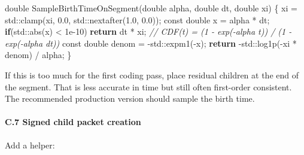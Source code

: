 \documentclass[
]{article}
\newenvironment{Shaded}{}{}
\newcommand{\AttributeTok}[1]{\textcolor[rgb]{0.49,0.56,0.16}{#1}}
\newcommand{\BuiltInTok}[1]{\textcolor[rgb]{0.00,0.50,0.00}{#1}}
\newcommand{\CommentTok}[1]{\textcolor[rgb]{0.38,0.63,0.69}{\textit{#1}}}
\newcommand{\ControlFlowTok}[1]{\textcolor[rgb]{0.00,0.44,0.13}{\textbf{#1}}}
\newcommand{\DataTypeTok}[1]{\textcolor[rgb]{0.56,0.13,0.00}{#1}}
\newcommand{\FloatTok}[1]{\textcolor[rgb]{0.25,0.63,0.44}{#1}}
\newcommand{\NormalTok}[1]{#1}
\newcommand{\OperatorTok}[1]{\textcolor[rgb]{0.40,0.40,0.40}{#1}}
\begin{document}
\begin{Shaded}
\begin{Highlighting}[]
\DataTypeTok{double}\NormalTok{ SampleBirthTimeOnSegment}\OperatorTok{(}\DataTypeTok{double}\NormalTok{ alpha}\OperatorTok{,} \DataTypeTok{double}\NormalTok{ dt}\OperatorTok{,} \DataTypeTok{double}\NormalTok{ xi}\OperatorTok{)}
\OperatorTok{\{}
\NormalTok{    xi }\OperatorTok{=} \BuiltInTok{std::}\NormalTok{clamp}\OperatorTok{(}\NormalTok{xi}\OperatorTok{,} \FloatTok{0.0}\OperatorTok{,} \BuiltInTok{std::}\NormalTok{nextafter}\OperatorTok{(}\FloatTok{1.0}\OperatorTok{,} \FloatTok{0.0}\OperatorTok{));}
    \AttributeTok{const} \DataTypeTok{double}\NormalTok{ x }\OperatorTok{=}\NormalTok{ alpha }\OperatorTok{*}\NormalTok{ dt}\OperatorTok{;}
    \ControlFlowTok{if}\OperatorTok{(}\BuiltInTok{std::}\NormalTok{abs}\OperatorTok{(}\NormalTok{x}\OperatorTok{)} \OperatorTok{\textless{}} \FloatTok{1e{-}10}\OperatorTok{)}
        \ControlFlowTok{return}\NormalTok{ dt }\OperatorTok{*}\NormalTok{ xi}\OperatorTok{;}
    \CommentTok{// CDF(t) = (1 {-} exp({-}alpha t)) / (1 {-} exp({-}alpha dt))}
    \AttributeTok{const} \DataTypeTok{double}\NormalTok{ denom }\OperatorTok{=} \OperatorTok{{-}}\BuiltInTok{std::}\NormalTok{expm1}\OperatorTok{({-}}\NormalTok{x}\OperatorTok{);}
    \ControlFlowTok{return} \OperatorTok{{-}}\BuiltInTok{std::}\NormalTok{log1p}\OperatorTok{({-}}\NormalTok{xi }\OperatorTok{*}\NormalTok{ denom}\OperatorTok{)} \OperatorTok{/}\NormalTok{ alpha}\OperatorTok{;}
\OperatorTok{\}}
\end{Highlighting}
\end{Shaded}

If this is too much for the first coding pass, place residual children
at the end of the segment. That is less accurate in time but still often
first-order consistent. The recommended production version should sample
the birth time.

\paragraph{C.7 Signed child packet
creation}\label{c.7-signed-child-packet-creation}

Add a helper:
\end{document}
